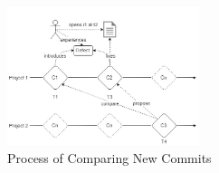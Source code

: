 \begin{figure}
  \centering
    \includegraphics[width=0.5\textwidth]{media/chap7/comparing}
    \caption{Process of Comparing New Commits\label{fig:COMPARING}}
\end{figure}